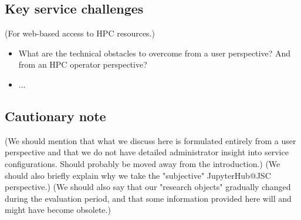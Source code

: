 \subsection{Key service challenges}

(For web-based access to HPC resources.)

\begin{itemize}
  \item What are the technical obstacles to overcome from a user perspective? And from an HPC operator perspective?
  \item ...
\end{itemize}

\subsection{Cautionary note}

(We should mention that what we discuss here is formulated entirely from a user perspective and that we do not have detailed administrator insight into service configurations. Should probably be moved away from the introduction.) (We should also briefly explain why we take the "subjective" JupyterHub@JSC perspective.)
(We should also say that our "research objects" gradually changed during the evaluation period, and that some information provided here will and might have become obsolete.)
